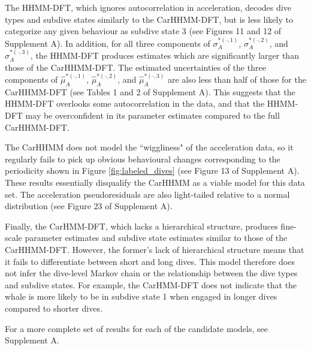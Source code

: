 The HHMM-DFT, which ignores autocorrelation in acceleration, decodes dive types and subdive states similarly to the CarHHMM-DFT, but is less likely to categorize 
any given behaviour as subdive state 3 (see Figures 11 and 12 of Supplement A). In addition, for all three components of $\sigma_A^{*(\cdot,1)}$, $\sigma_A^{*(\cdot,2)}$, and $\sigma_A^{*(\cdot,3)}$, the HHMM-DFT produces estimates which are significantly larger than those of the CarHHMM-DFT. The estimated uncertainties of the three components of $\hat \mu_A^{*(\cdot,1)}$, $\hat \mu_A^{*(\cdot,2)}$, and $\hat \mu_A^{*(\cdot,3)}$ are also less than half of those for the CarHHMM-DFT (see Tables 1 and 2 of Supplement A). This suggests that the HHMM-DFT overlooks some autocorrelation in the data, and that the HHMM-DFT may be overconfident in its parameter estimates compared to the full CarHHMM-DFT.

The CarHHMM does not model the ``wiggliness" of the acceleration data, so it regularly fails to pick up obvious behavioural changes corresponding to the periodicity shown in Figure \ref{fig:labeled_dives} (see Figure 13 of Supplement A). These results essentially disqualify the CarHHMM as a viable model for this data set. The acceleration pseudoresiduals are also light-tailed relative to a normal distribution (see Figure 23 of Supplement A).

Finally, the CarHMM-DFT, which lacks a hierarchical structure, produces fine-scale parameter estimates and subdive state estimates similar to those of the CarHHMM-DFT. However, the former's lack of hierarchical structure means that it fails to differentiate between short and long dives. This model therefore does not infer the dive-level Markov chain or the relationship between the dive types and subdive states. For example, the CarHMM-DFT does not indicate that the whale is more likely to be in subdive state 1 when engaged in longer dives compared to shorter dives. 

For a more complete set of results for each of the candidate models, see Supplement A.